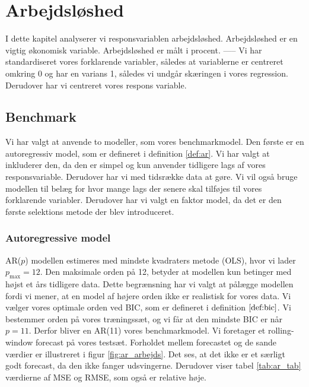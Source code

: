 \chapter{Arbejdsløshed}
I dette kapitel analyserer vi responsvariablen arbejdsløshed. 
Arbejdsløshed er en vigtig økonomisk variable. 
Arbejdsløshed er målt i procent. 
-----
Vi har standardiseret vores forklarende variabler, således at variablerne er centreret omkring 0 og har en varians 1, således vi undgår skæringen i vores regression.
Derudover har vi centreret vores respons variable. 
\section{Benchmark}
Vi har valgt at anvende to modeller, som vores benchmarkmodel. 
Den første er en autoregressiv model, som er defineret  i definition \ref{def:ar}.
Vi har valgt at inkluderer den, da den er simpel og kun anvender tidligere lags af vores responsvariable. 
Derudover har vi med tidsrække data at gøre. 
Vi vil også bruge modellen til belæg for hvor mange lags der senere skal tilføjes til vores forklarende variabler. 
Derudover har vi valgt en faktor model, da det er den første selektions metode der blev introduceret. 

\subsection{Autoregressive model}
AR($p$) modellen estimeres med mindste kvadraters metode (OLS), hvor vi lader $p_{\text{max}} = 12$. 
Den maksimale orden på 12, betyder at modellen kun betinger med højst et års tidligere data. 
Dette begrænsning har vi valgt at pålægge modellen fordi vi mener, at en model af højere orden ikke er realistisk for vores data. 
Vi vælger vores optimale orden ved BIC, som er defineret i definition $\ref{def:bic}$.
Vi bestemmer orden på vores træningssæt, og vi får at den mindste BIC er når $p=11$.
Derfor bliver en AR(11) vores benchmarkmodel. 
Vi foretager et rolling-window forecast på vores testsæt.
Forholdet mellem forecastet og de sande værdier er illustreret i figur \ref{fig:ar_arbejds}. 
Det ses, at det ikke er et særligt godt forecast, da den ikke fanger udsvingerne. 
Derudover viser tabel \ref{tab:ar_tab} værdierne af MSE og RMSE, som også er relative høje. 


